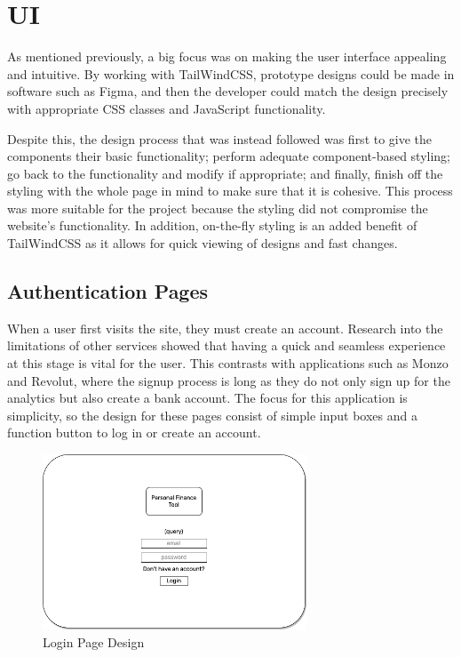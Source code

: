 \section{UI}
\label{sec:ui}
As mentioned previously, a big focus was on making the user interface appealing and intuitive. By working with TailWindCSS, prototype designs could be made in software such as Figma, and then the developer could match the design precisely with appropriate CSS classes and JavaScript functionality.

Despite this, the design process that was instead followed was first to give the components their basic functionality; perform adequate component-based styling; go back to the functionality and modify if appropriate; and finally, finish off the styling with the whole page in mind to make sure that it is cohesive. This process was more suitable for the project because the styling did not compromise the website's functionality. In addition, on-the-fly styling is an added benefit of TailWindCSS as it allows for quick viewing of designs and fast changes.

\subsection{Authentication Pages}
When a user first visits the site, they must create an account. Research into the limitations of other services showed that having a quick and seamless experience at this stage is vital for the user. This contrasts with applications such as Monzo and Revolut, where the signup process is long as they do not only sign up for the analytics but also create a bank account. The focus for this application is simplicity, so the design for these pages consist of simple input boxes and a function button to log in or create an account.

\begin{figure}[H]
	\centering
	\includegraphics[width=0.7\textwidth]{images/login_specification.png}
	\caption{Login Page Design}
	\label{fig:LoginPage}
\end{figure}

